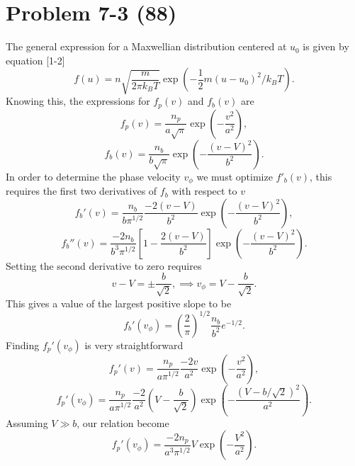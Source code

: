\section*{Problem 7-3 (88)}
\label{sec:7-3}
The general expression for a Maxwellian distribution centered at \(u_0\) is given by equation [1-2]
\begin{equation*}
	f(u) = n\sqrt{\dfrac{m}{2\pi k_BT}}\exp\left(-\dfrac{1}{2}m\left(u - u_0\right)^2/k_BT \right).
\end{equation*}
Knowing this, the expressions for \(f_p(v) \) and \(f_b(v)\) are
\begin{equation*}
	f_p(v) = \dfrac{n_p}{a\sqrt{\pi}}\exp\left(-\dfrac{v^2}{a^2} \right),
\end{equation*}
\begin{equation*}
	f_b(v) = \dfrac{n_b}{b\sqrt{\pi}}\exp\left(-\dfrac{(v-V)^2}{b^2} \right).
\end{equation*}
In order to determine the phase velocity \(v_\phi \) we must optimize \(f'_b(v)\), this requires the first two derivatives of \(f_b\) with respect to \(v\)
\begin{equation*}
	f_b'(v) = \dfrac{n_b}{b\pi^{1/2}}\dfrac{-2(v-V)}{b^2}\exp\left(-\dfrac{(v-V)^2}{b^2} \right),
\end{equation*}
\begin{equation*}
	f_b''(v) = \dfrac{-2n_b}{b^3\pi^{1/2}}\left[1 - \dfrac{2(v-V)}{b^2}\right]\exp\left(-\dfrac{(v-V)^2}{b^2} \right).
\end{equation*}
Setting the second derivative to zero requires
\begin{equation*}
	v - V = \pm \dfrac{b}{\sqrt{2}}, \implies v_\phi = V - \dfrac{b}{\sqrt{2}}.
\end{equation*}
This gives a value of the largest positive slope to be
\begin{equation*}
	f_b'(v_\phi) = \left(\dfrac{2}{\pi}\right)^{1/2}\dfrac{n_b}{b^2}e^{-1/2}.
\end{equation*}
Finding \(f_p'(v_\phi)\) is very straightforward 
\begin{equation*}
	f_p'(v) = \dfrac{n_p}{a\pi^{1/2}}\dfrac{-2v}{a^2}\exp\left(-\dfrac{v^2}{a^2} \right),
\end{equation*}
\begin{equation*}
	f_p'(v_\phi) = \dfrac{n_p}{a\pi^{1/2}}\dfrac{-2}{a^2}\left(V - \dfrac{b}{\sqrt{2}}\right)\exp\left(-\dfrac{\left(V - b/\sqrt{2}\right)^2}{a^2} \right).
\end{equation*}
Assuming \(V \gg b\), our relation become
\begin{equation*}
	f_p'(v_\phi) = \dfrac{-2n_p}{a^3\pi^{1/2}}V\exp\left(-\dfrac{V^2}{a^2} \right).
\end{equation*}
